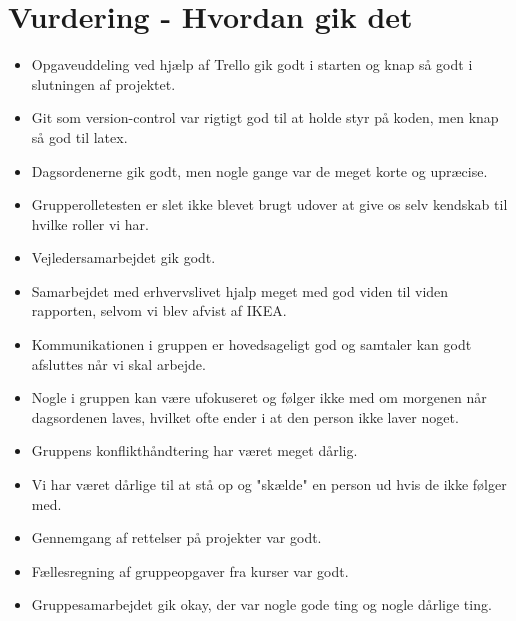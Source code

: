 \documentclass[oneside,a4paper,titlepage]{article}
\begin{document}


\section{Vurdering - Hvordan gik det}
\begin{itemize}
  \item Opgaveuddeling ved hjælp af Trello gik godt i starten og knap så godt i slutningen af projektet.
  \item Git som version-control var rigtigt god til at holde styr på koden, men knap så god til latex.
  \item Dagsordenerne gik godt, men nogle gange var de meget korte og upræcise.
  \item Grupperolletesten er slet ikke blevet brugt udover at give os selv kendskab til hvilke roller vi har.
  \item Vejledersamarbejdet gik godt.
  \item Samarbejdet med erhvervslivet hjalp meget med god viden til viden rapporten, selvom vi blev afvist af IKEA.
  \item Kommunikationen i gruppen er hovedsageligt god og samtaler kan godt afsluttes når vi skal arbejde. 
  \item Nogle i gruppen kan være ufokuseret og følger ikke med om morgenen når dagsordenen laves, hvilket ofte ender i at den person ikke laver noget.
  \item Gruppens konflikthåndtering har været meget dårlig.
  \item Vi har været dårlige til at stå op og "skælde" en person ud hvis de ikke følger med.
  \item Gennemgang af rettelser på projekter var godt.
  \item Fællesregning af gruppeopgaver fra kurser var godt.
  \item Gruppesamarbejdet gik okay, der var nogle gode ting og nogle dårlige ting. 
\end{itemize}
\end{document}
